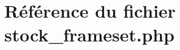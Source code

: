 \hypertarget{stock__frameset_8php}{
\section{R\'{e}f\'{e}rence du fichier stock\_\-frameset.php}
\label{stock__frameset_8php}
}
